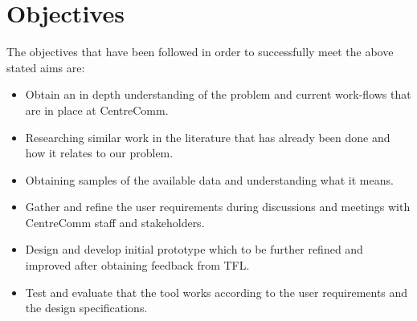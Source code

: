 \section{Objectives}
The objectives that have been followed in order to successfully meet the above stated aims are:
\begin{itemize}
	\item Obtain an in depth understanding of the problem and current work-flows that are in place at CentreComm.
	\item Researching similar work in the literature that has already been done and how it relates to our problem.
	\item Obtaining samples of the available data and understanding what it means.
	\item Gather and refine the user requirements during discussions and meetings with CentreComm staff and stakeholders.
	\item Design and develop initial prototype which to be further refined and improved after obtaining feedback from TFL.
	\item Test and evaluate that the tool works according to the user requirements and the design specifications.
\end{itemize}


